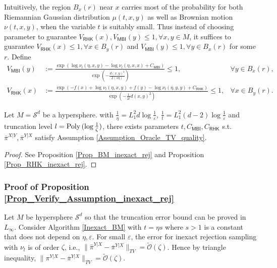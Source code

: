 Intuitively, the region $B_{x}(r)$ near $x$ carries most of the probability for both Riemannian Gaussian distribution $\mu(t, x, y)$ as well as Brownian motion $\nu(t, x, y)$, when the variable $t$ is suitably small.
Thus instead of choosing parameter to guarantee $V_{\mathsf{RHK}}(x), V_{\mathsf{MBI}}(y)\le 1, \forall x, y \in M$, it suffices to guarantee $V_{\mathsf{RHK}}(x) \le 1, \forall x \in B_{y}(r)$
and $V_{\mathsf{MBI}}(y)\le 1, \forall y \in B_{x}(r)$ for some $r$. Define
\begin{align*}
    V_{\mathsf{MBI}}(y) &:= \frac{\exp(\log \nu_{l}(\eta, x, y) - \log \nu_{l}(\eta, x, x) + C_{\mathsf{MBI}})}{\exp(-\frac{d(x, y)^{2}}{2(s\eta)})} \le 1, &\forall y \in B_{x}(r), \\
        V_{\mathsf{RHK}}(x) &:= \frac{\exp(-f(x) + \log \nu_{l}(\eta, x, y) + f(y) - \log \nu_{l}(\eta, y, y) + C_{\mathsf{RHK}})}{\exp(-\frac{1}{2t} d(x, y)^{2})} \le 1, &\forall x \in B_{y}(r).
\end{align*}
\begin{proposition}\label{Prop_Verify_Assumption_inexact_rej}
    Let $M = \mathcal{S}^{d}$ be a hypersphere. with $\frac{1}{\eta }= L_{1}^{2} d \log \frac{1}{\varepsilon} $, $\frac{1}{t} = L_{1}^{2}(d-2)  \log \frac{1}{\varepsilon}$ and truncation level $l = \operatorname{Poly\,}(\log \frac{1}{\zeta})$, there exists parameters $t, C_{\mathsf{MBI}}, C_{\mathsf{RHK}}$ s.t. 
    $\overline{\pi}^{X|Y}, \overline{\pi}^{Y|X}$ satisfy Assumption \ref{Assumption_Oracle_TV_quality}.
\end{proposition}
\begin{proof}
    See Proposition \ref{Prop_BM_inexact_rej} and Proposition \ref{Prop_RHK_inexact_rej}.
\end{proof}

\subsubsection{Proof of Proposition \ref{Prop_Verify_Assumption_inexact_rej}}


\begin{proposition}\label{Prop_BM_inexact_rej}
    Let $M$ be hypersphere $\mathcal{S}^{d}$ so that the truncation error bound can be proved in $L_{\infty}$.
    Consider Algorithm \ref{Inexact_BM} with $ t = \eta s $ where $s > 1$ is a constant that does not depend on $\eta, \varepsilon$. 
    For small $\varepsilon$, the error for inexact rejection sampling with $\nu_{l}$ is of order $\zeta$, i.e., 
    $\|\hat{\pi}^{Y|X} - \overline{\pi}^{Y|X}\|_{TV} = \tilde{\mathcal{O}}(\zeta)$.
    Hence by triangle inequality, 
    $\|\pi^{Y|X} - \overline{\pi}^{Y|X}\|_{TV} = \tilde{\mathcal{O}}(\zeta)$.
\end{proposition}

